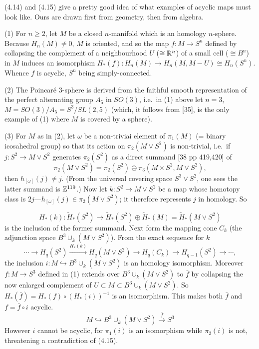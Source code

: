(4.14) and (4.15) give a pretty good idea of what examples of acyclic maps must look like.
Ours are drawn first from geometry, then from algebra.
\begin{ex}
  (1) For $n \geqslant 2$, let $M$ be a closed $n$-manifold which is an homology $n$-sphere. Because $H_n(M) \neq 0$, $M$ is oriented, and so the map $f \colon    M \longrightarrow S^n$ defined by collapsing the complement of a neighbourhood $U$ ($\cong \mathbb{R}^n$) of a small cell ($\cong B^n$) in $M$ induces an isomorphism
$H_*(f) \colon   H_n(M) \longrightarrow H_n(M, M-U) \cong H_n(S^n)$. Whence $f$ is acyclic, $S^n$ being simply-connected.

(2) The Poincar\'e $3$-sphere is derived from the faithful smooth representation of the perfect alternating group $A_5$  in $SO(3)$, i.e.\  in (1) above let $n = 3$, $M = SO(3)/A_5 = S^3/SL(2,5)$ (which, it follows from [35], is the only example of (1) where $M$ is covered by a sphere).

(3) For $M$ as in (2), let $\omega$ be a non-triviai element of $\pi_1(M)$ (= binary icosahedral group) so that its action on $\pi_2(M\vee S^2)$ is non-trivial, i.e.\  if $j \colon    S^2 \longrightarrow M\vee S^2$ generates $\pi_2(S^2)$ as a direct summand [38 pp 419,420] of
\[\pi_2(M\vee S^2) = \pi_2(S^2) \oplus \pi_3(M\times S^2, M\vee S^2), \]
then $h_{[\omega]}(j)\neq j$. (From the universal covering space $S^3 \vee  S^2$, one sees the latter summand is $\mathbb{Z}^{119}$.) Now let $k\colon  S^2 \longrightarrow M\vee S^2$ be a map whose homotopy class is $2j—h_{[\omega]}(j)\in \pi_2(M\vee S^2)$; it therefore represents $j$ in homology. So

\[H_*(k) \colon   \widetilde{H}_*(S^2)\longrightarrow \widetilde{H}_*(S^2) \oplus \widetilde{H}_*(M) = \widetilde{H}_*(M\vee S^2)\]
is the inclusion of the former summand. Next form the mapping cone $C_k$ (the adjunction space $B^3\cup_k (M\vee S^2)$). From the exact sequence for $k$ 
\[
\cdots \longrightarrow H_q(S^2) \overset{H_*(k)}\longrightarrow H_q(M\vee S^2) \longrightarrow H_q(C_k)\longrightarrow H_{q-1}(S^2)\longrightarrow \cdots ,\] 
the inclusion $i\colon   M\hookrightarrow B^3\cup_k (M\vee S^2)$ is an homology isomorphism. Moreover $f\colon   M \longrightarrow S^3$ defined in (1) extends over $B^3\cup_k (M\vee S^2)$ to $\bar{f}$ by collapsing the now enlarged complement of $U \subset M \subset B^3\cup_k (M\vee S^2)$. So $H_*(\bar{f})= H_*(f)\circ(H_*(i))^{-1}$ is an isomorphism. This makes both $\bar{f}$ and $f = \bar{f} \circ i$ acyclic.
\[M \hookrightarrow B^3\cup_k (M\vee S^2) \overset{\bar{f}}\longrightarrow S^3\]
However $i$ cannot be acyclic, for $\pi_1(i)$ is an isomorphism while $\pi_2(i)$ is not, threatening a contradiction of (4.15).


\end{ex}
